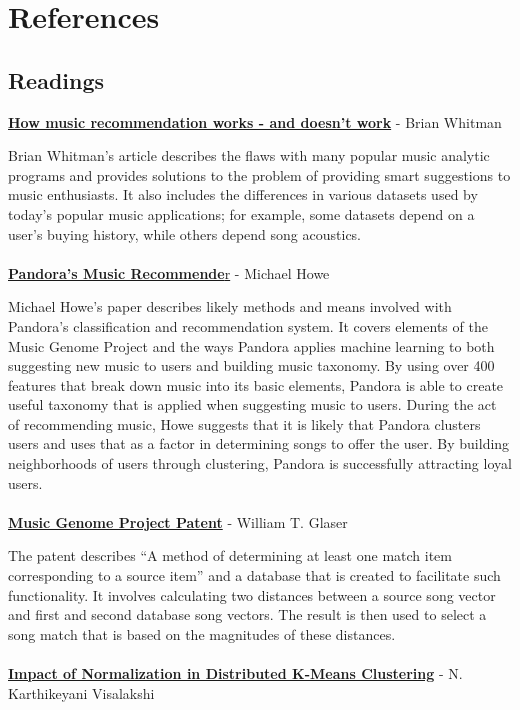 \documentclass[12pt]{article}
\begin{document}
\section{References}
\label{sec:references}

\subsection{Readings}
\label{subsec:readings}
\href{http://notes.variogr.am/post/37675885491/how-music-recommendation-works-and-doesnt-work}{\textbf{How music recommendation works - and doesn't work}} - Brian Whitman

Brian Whitman's article describes the flaws with many popular music analytic programs and provides solutions to the problem of providing smart suggestions to music enthusiasts. It also includes the differences in various datasets used by today's popular music applications; for example, some datasets depend on a user's buying history, while others depend song acoustics.
\\
\\
\href{http://courses.cs.washington.edu/courses/csep521/07wi/prj/michael.pdf}{\textbf{Pandora's Music Recommende}r} - Michael Howe 

Michael Howe's paper describes likely methods and means involved with Pandora's classification and recommendation system. It covers elements of the Music Genome Project and the ways Pandora applies machine learning to both suggesting new music to users and building music taxonomy. By using over 400 features that break down music into its basic elements, Pandora is able to create useful taxonomy that is applied when suggesting music to users. During the act of recommending music, Howe suggests that it is likely that Pandora clusters users and uses that as a factor in determining songs to offer the user. By building neighborhoods of users through clustering, Pandora is successfully attracting loyal users.
\\
\\
\href{http://www.google.com/patents/US7003515?dq=7,003,515}{\textbf{Music Genome Project Patent}} - William T. Glaser 

The patent describes  ``A method of determining at least one match item corresponding to a source item'' and a database that is created to facilitate such functionality. It involves calculating two distances between a source song vector and  first and second database song vectors. The result is then used to select a song match that is based on the magnitudes of these distances.
\\
\\
\href{http://www.medwelljournals.com/fulltext/?doi=ijscomp.2009.168.172}{\textbf{Impact of Normalization in Distributed K-Means Clustering}} - N. Karthikeyani Visalakshi 
\end{document}
